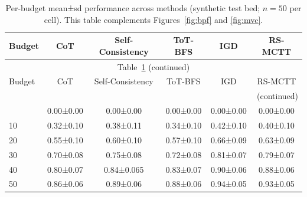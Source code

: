 \begin{table}[h]
\centering
\caption{Ablations at budget $B{=}30$ (mean, sd, and 95\% CI). Risk-aware elements and discounting each contribute to IGD; depth-wise risk improves RS-MCTT.}
\vspace{0.5em}
\small
{}
\label{tab:ablation}
\end{table}

\begin{center}
\setlength{\LTcapwidth}{\linewidth}
\begin{longtable}{lccccc}
\caption{Per-budget mean±sd performance across methods (synthetic test bed; $n{=}50$ per cell). This table complements Figures~\ref{fig:bpf} and \ref{fig:mvc}.}
\label{tab:perbudget}\\
\toprule
Budget & CoT & Self-Consistency & ToT-BFS & IGD & RS-MCTT \\
\midrule
\endfirsthead
\multicolumn{6}{c}{Table~\ref{tab:perbudget} (continued)}\\
\toprule
Budget & CoT & Self-Consistency & ToT-BFS & IGD & RS-MCTT \\
\midrule
\endhead
\midrule
\multicolumn{6}{r}{(continued)}\\
\endfoot
\bottomrule
\endlastfoot
0  & 0.00±0.00 & 0.00±0.00 & 0.00±0.00 & 0.00±0.00 & 0.00±0.00 \\
10 & 0.32±0.10 & 0.38±0.11 & 0.34±0.10 & 0.42±0.10 & 0.40±0.10 \\
20 & 0.55±0.10 & 0.60±0.10 & 0.57±0.10 & 0.66±0.09 & 0.63±0.09 \\
30 & 0.70±0.08 & 0.75±0.08 & 0.72±0.08 & 0.81±0.07 & 0.79±0.07 \\
40 & 0.80±0.07 & 0.84±0.065 & 0.83±0.07 & 0.90±0.06 & 0.88±0.06 \\
50 & 0.86±0.06 & 0.89±0.06 & 0.88±0.06 & 0.94±0.05 & 0.93±0.05 \\
\end{longtable}
\end{center}

